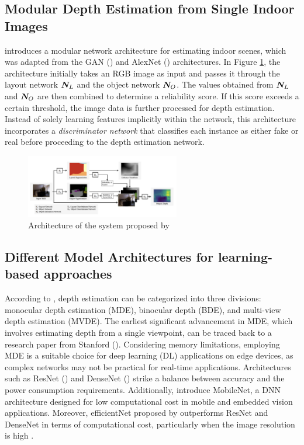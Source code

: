 \documentclass{article} %
\begin{document}
\subsection{Modular Depth Estimation from Single Indoor Images}

\cite{10.1007/978-3-030-11009-3_19} introduces a modular network architecture for estimating indoor scenes, which was adapted from the GAN (\cite{Gan2014}) and AlexNet (\cite{NIPS2012_4824}) architectures. In Figure \ref{Ito2019-figure}, the architecture initially takes an RGB image as input and passes it through the layout network $\displaystyle {\bm{N}}_L$ and the object network $\displaystyle {\bm{N}}_O$. The values obtained from $\displaystyle {\bm{N}}_L$ and $\displaystyle {\bm{N}}_O$ are then combined to determine a reliability score. If this score exceeds a certain threshold, the image data is further processed for depth estimation. Instead of solely learning features implicitly within the network, this architecture incorporates a \textit{discriminator network} that classifies each instance as either fake or real before proceeding to the depth estimation network.

\begin{figure}[h]
\begin{center}
\includegraphics[width=0.6\textwidth]{Figs/Ito2019-figure.png}
\end{center}
\caption{Architecture of the system proposed by \citet{10.1007/978-3-030-11009-3_19}}
\label{Ito2019-figure}
\end{figure}


\subsection{Different Model Architectures for learning-based approaches}

According to \cite{Masoumian}, depth estimation can be categorized into three divisions: monocular depth estimation (MDE), binocular depth (BDE), and multi-view depth estimation (MVDE). The earliest significant advancement in MDE, which involves estimating depth from a single viewpoint, can be traced back to a research paper from Stanford (\cite{Liu_2016}). Considering memory limitations, employing MDE is a suitable choice for deep learning (DL) applications on edge devices, as complex networks may not be practical for real-time applications. Architectures such as ResNet (\cite{He2015}) and DenseNet (\cite{huang2017densely}) strike a balance between accuracy and the power consumption requirements. Additionally, \cite{MobileNet2017} introduce MobileNet, a DNN architecture designed for low computational cost in mobile and embedded vision applications. Moreover, efficientNet proposed by \cite{tan2020efficientnet} outperforms ResNet and DenseNet in terms of computational cost, particularly when the image resolution is high \cite{Tadepalli}.
\end{document}
